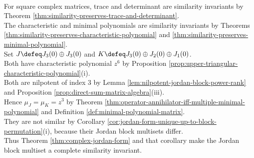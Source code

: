 \begin{perspective} \label{per:similarity-invariants-and-canonical-forms} \\
For square complex matrices, trace and determinant are similarity invariants by Theorem \ref{thm:similarity-preserves-trace-and-determinant}.\\
The characteristic and minimal polynomials are similarity invariants by Theorems \ref{thm:similarity-preserves-characteristic-polynomial} and \ref{thm:similarity-preserves-minimal-polynomial}.\\
Set $J\defeq J_3(0)\oplus J_3(0)$ and $K\defeq J_3(0)\oplus J_2(0)\oplus J_1(0)$.\\
Both have characteristic polynomial $z^6$ by Proposition \ref{prop:upper-triangular-characteristic-polynomial}(i).\\
Both are nilpotent of index $3$ by Lemma \ref{lem:nilpotent-jordan-block-power-rank} and Proposition \ref{prop:direct-sum-matrix-algebra}(iii).\\
Hence $\mu_J=\mu_K=z^3$ by Theorem \ref{thm:operator-annihilator-iff-multiple-minimal-polynomial} and Definition \ref{def:minimal-polynomial-matrix}.\\
They are not similar by Corollary \ref{cor:jordan-form-unique-up-to-block-permutation}(i), because their Jordan block multisets differ.\\
Thus Theorem \ref{thm:complex-jordan-form} and that corollary make the Jordan block multiset a complete similarity invariant.
\end{perspective}

